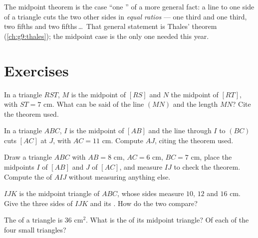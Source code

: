 \begin{remark}
The midpoint theorem is the case ``one '' of a more general fact:
a line  to one side of a triangle cuts the two other sides in
\emph{equal ratios} --- one third and one third, two fifths and two
fifths\,\dots\ That general statement is Thales' theorem
(\cref{ch:g9:thales}); the midpoint case is the only one needed this
year.
\end{remark}

\section{Exercises}

\begin{exercise}[$\star$]\label{exo:g8:midpoints:1}
In a triangle $RST$, $M$ is the midpoint of $[RS]$ and $N$ the
midpoint of $[RT]$, with $ST = 7$ cm. What can be said of the line
$(MN)$ and the length $MN$? Cite the theorem used.
\end{exercise}

\begin{exercise}[$\star$]\label{exo:g8:midpoints:2}
In a triangle $ABC$, $I$ is the midpoint of $[AB]$ and the line
through $I$  to $(BC)$ cuts $[AC]$ at $J$, with
$AC = 11$ cm. Compute $AJ$, citing the theorem used.
\end{exercise}

\begin{exercise}[$\star$]\label{exo:g8:midpoints:3}
Draw a triangle $ABC$ with $AB = 8$ cm, $AC = 6$ cm, $BC = 7$ cm,
place the midpoints $I$ of $[AB]$ and $J$ of $[AC]$, and measure $IJ$
to check the theorem. Compute the  of $AIJ$ without
measuring anything else.
\end{exercise}

\begin{exercise}[$\star$]\label{exo:g8:midpoints:4}
$IJK$ is the midpoint triangle of $ABC$, whose sides measure $10$,
$12$ and $16$ cm. Give the three sides of $IJK$ and its .
How do the two  compare?
\end{exercise}

\begin{exercise}[$\star$]\label{exo:g8:midpoints:5}
The  of a triangle is $36$ cm$^2$. What is the  of its
midpoint triangle? Of each of the four small triangles?
\end{exercise}

